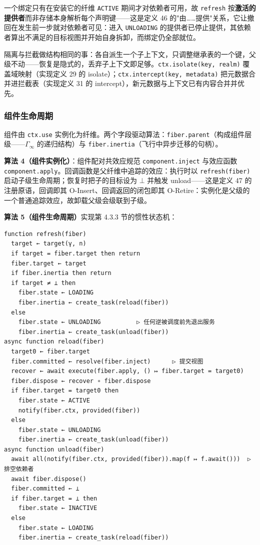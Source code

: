 \documentclass[11pt,a4paper]{article}
\theoremstyle{plain}
\theoremstyle{definition}
\theoremstyle{remark}
\begin{document}
一个绑定只有在安装它的纤维 \texttt{ACTIVE} 期间才对依赖者可用，故 \texttt{refresh} 按\textbf{激活的提供者}而非存储本身解析每个声明键——这是定义 46 的"由……提供"关系，它让撤回在发生前一步就对依赖者可见：进入 \texttt{UNLOADING} 的提供者已停止提供，其依赖者算出不满足的目标视图并开始自身拆卸，而绑定仍全部就位。

隔离与拦截做结构相同的事：各自派生一个子上下文，只调整继承表的一个键，父级不动——恢复是隐式的，丢弃子上下文即足够。\texttt{ctx.isolate(key, realm)} 覆盖域映射（实现定义 29 的 isolate）；\texttt{ctx.intercept(key, metadata)} 把元数据合并进拦截表（实现定义 31 的 intercept），新元数据与上下文已有内容合并并优先。

\subsubsection{组件生命周期}

组件由 \texttt{ctx.use} 实例化为纤维。两个字段驱动算法：\texttt{fiber.parent}（构成组件层级——$\Gamma_\infty$ 的递归结构）与 \texttt{fiber.inertia}（飞行中异步迁移的句柄）。

\textbf{算法 4（组件实例化）}：组件配对共效应规范 \texttt{component.inject} 与效应函数 \texttt{component.apply}。回调函数是父纤维中追踪的效应：执行时以 \texttt{refresh(fiber)} 启动子级生命周期；恢复时把子的目标设为 $\bot$ 并触发 unload——这是定义 47 的注册原语，回调即其 O-Insert、回调返回的闭包即其 O-Retire：实例化是父级的一个普通追踪效应，故卸载父级会级联到子级。

\textbf{算法 5（组件生命周期）}实现第 4.3.3 节的惯性状态机：

\begin{verbatim}
function refresh(fiber)
  target ← target(γ, n)
  if target = fiber.target then return
  fiber.target ← target
  if fiber.inertia then return
  if target ≠ ⊥ then
    fiber.state ← LOADING
    fiber.inertia ← create_task(reload(fiber))
  else
    fiber.state ← UNLOADING          ▷ 任何逆被调度前先退出服务
    fiber.inertia ← create_task(unload(fiber))
async function reload(fiber)
  target0 ← fiber.target
  fiber.committed ← resolve(fiber.inject)      ▷ 提交视图
  recover ← await execute(fiber.apply, () ↦ fiber.target = target0)
  fiber.dispose ← recover ∘ fiber.dispose
  if fiber.target = target0 then
    fiber.state ← ACTIVE
    notify(fiber.ctx, provided(fiber))
  else
    fiber.state ← UNLOADING
    fiber.inertia ← create_task(unload(fiber))
async function unload(fiber)
  await all(notify(fiber.ctx, provided(fiber)).map(f ↦ f.await()))  ▷ 排空依赖者
  await fiber.dispose()
  fiber.committed ← ⊥
  if fiber.target = ⊥ then
    fiber.state ← INACTIVE
  else
    fiber.state ← LOADING
    fiber.inertia ← create_task(reload(fiber))
\end{verbatim}
\end{document}
